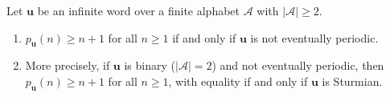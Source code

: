 \begin{theorem}%
  \label{thm:morse-hedlund}
  Let \(\mathbf{u}\) be an infinite word over a finite alphabet
  \(\mathcal{A}\) with \(|\mathcal{A}|\geq 2\).
  \begin{enumerate}[label=(\alph*)]
    \item \(p_{\mathbf{u}}(n)\geq n+1\) for all \(n\geq 1\)
      if and only if \(\mathbf{u}\) is not eventually periodic.
    \item More precisely, if \(\mathbf{u}\) is binary
      (\(|\mathcal{A}|=2\)) and not eventually periodic, then
      \(p_{\mathbf{u}}(n)\geq n+1\) for all \(n\geq 1\), with
      equality if and only if \(\mathbf{u}\) is Sturmian.
  \end{enumerate}
\end{theorem}
